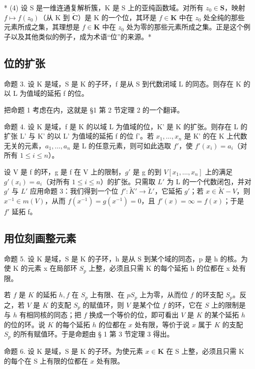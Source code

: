 * (4) 设 S 是一维连通复解析簇，K 是 S 上的亚纯函数域。对所有 \(z_0 \in \mathbf{S}\)，映射 \(f \mapsto f(z_0)\)（从 K 到 \(\tilde{\mathbf{C}}\)）是 K 的一个位，其环是 \(f \in \mathbf{K}\) 中在 \(z_0\) 处全纯的那些元素所成之集，其理想是 \(f \in \mathbf{K}\) 中在 \(z_0\) 处为零的那些元素所成之集。正是这个例子以及其他类似的例子，成为术语“位”的来源。*

\subsection{位的扩张}

命题 3. 设 K 是域，S 是 K 的子环，f 是从 S 到代数闭域 L 的同态。则存在 K 的以 L 为值域的延拓 f 的位。

把命题 1 考虑在内，这就是 §1 第 2 节定理 2 的一个翻译。

命题 4. 设 K 是域，f 是 K 的以域 L 为值域的位，K' 是 K 的扩张。则存在 L 的扩张 L' 与 K' 的以 L' 为值域的延拓 f 的位 f'。若 \(x_{1}, \ldots, x_{n}\) 是 K' 的在 K 上代数无关的元素，\(a_1, \ldots, a_n\) 是 L 的任意元素，则可如此选取 \(f'\)，使 \(f'(x_i) = a_i\)（对所有 \(1 \leqslant i \leqslant n\)）。

设 V 是 f 的环，g 是 f 在 V 上的限制，\(g'\) 是 g 的到 \(V[x_{1},\ldots,x_{n}]\) 上的满足 \(g'(x_{i}) = a_{i}\)（对所有 \(1 \leqslant i \leqslant n\)）的扩张。只需取 \(L'\) 为 L 的一个代数闭包，并对 \(g'\) 与 \(L'\) 应用命题 3：我们得到一个位 \(f'\colon \tilde{K}' \to \tilde{L}'\)，它延拓 \(g'\)；若 \(x \in \tilde{K} - V\)，则 \(x^{-1} \in m(V)\)，从而 \(f(x^{-1}) = g(x^{-1}) = 0\)，且 \(f'(x) = \infty = f(x)\)；于是 \(f'\) 延拓 f。

\subsection{用位刻画整元素}

命题 5. 设 K 是域，S 是 K 的子环，h 是从 S 到某个域的同态，p 是 h 的核。为使 K 的元素 x 在局部环 \(S_{p}\) 上整，必须且只需 K 的每个延拓 h 的位都在 x 处有限。

若 \(f\) 是 \(K\) 的延拓 \(h, f\) 在 \(S_p\) 上有限、在 \(pS_p\) 上为零，从而位 \(f\) 的环支配 \(S_p\)。反之，若 \(V\) 是 \(K\) 的支配 \(S_p\) 的赋值环，则 \(V\) 是某个位 \(f\) 的环，它在 \(S\) 上的限制是与 \(h\) 有相同核的同态；把 \(f\) 换成一个等价的位，即可看出 \(V\) 是 \(K\) 的某个延拓 \(h\) 的位的环。说 \(K\) 的每个延拓 \(h\) 的位都在 \(x\) 处有限，等价于说 \(x\) 属于 \(K\) 的支配 \(S_p\) 的所有赋值环。于是命题由 § 1 第 3 节定理 3 得出。

命题 6. 设 K 是域，S 是 K 的子环。为使元素 \(x \in \mathbf{K}\) 在 S 上整，必须且只需 K 的每个在 S 上有限的位都在 \(x\) 处有限。

